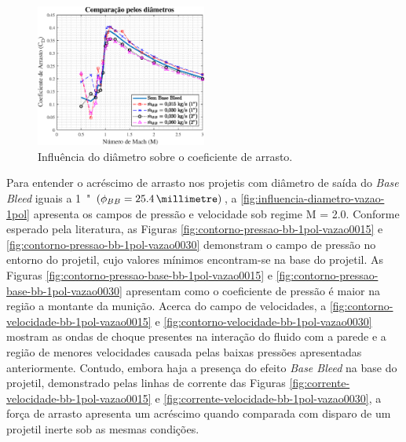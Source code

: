 \begin{figure}[!ht]
	\centering
    \includegraphics[width=0.5\textwidth]{cd-combasebleed-diametro-1e2pol.eps}
	\caption{Influência do diâmetro sobre o coeficiente de arrasto.}
	\label{fig:comparacao-bb-diametro-1e2pol}
\end{figure}

Para entender o acréscimo de arrasto nos projetis com diâmetro de saída do \textit{Base Bleed} iguais a \qty{1}{"} \(\left(\phi_{BB} = \qty{25,4}{\millimetre}\right)\), a \autoref{fig:influencia-diametro-vazao-1pol} apresenta os campos de pressão e velocidade sob regime M = \num{2,0}. Conforme esperado pela literatura, as Figuras \ref{fig:contorno-pressao-bb-1pol-vazao0015} e \ref{fig:contorno-pressao-bb-1pol-vazao0030} demonstram o campo de pressão no entorno do projetil, cujo valores mínimos encontram-se na base do projetil. As Figuras \ref{fig:contorno-pressao-base-bb-1pol-vazao0015} e \ref{fig:contorno-pressao-base-bb-1pol-vazao0030} apresentam como o coeficiente de pressão é maior na região a montante da munição. Acerca do campo de velocidades, a \autoref{fig:contorno-velocidade-bb-1pol-vazao0015} e \autoref{fig:contorno-velocidade-bb-1pol-vazao0030} mostram as ondas de choque presentes na interação do fluido com a parede e a região de menores velocidades causada pelas baixas pressões apresentadas anteriormente. Contudo, embora haja a presença do efeito \textit{Base Bleed} na base do projetil, demonstrado pelas linhas de corrente das Figuras \ref{fig:corrente-velocidade-bb-1pol-vazao0015} e \ref{fig:corrente-velocidade-bb-1pol-vazao0030}, a força de arrasto apresenta um acréscimo quando comparada com disparo de um projetil inerte sob as mesmas condições.

